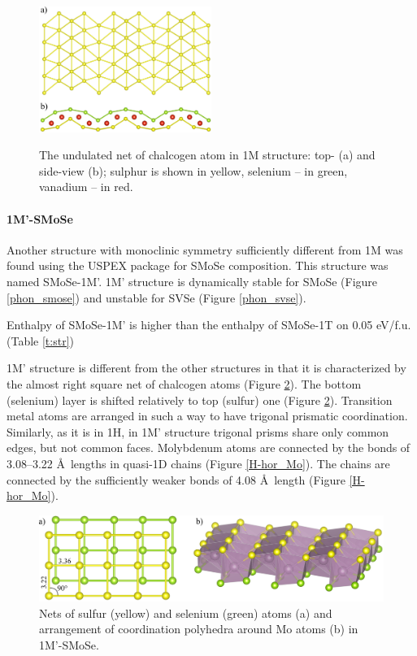 \documentclass[a4paperm]{article}
\begin{document}
\begin{figure}[H]
        \includegraphics[width=0.5\textwidth]{T_hor_hcb.png} \\
        \caption{The undulated net of chalcogen atom in 1M structure: top- (a) and side-view (b); sulphur is shown in yellow, selenium -- in green, vanadium -- in red.}
\label{T_hor_hcb}
\end{figure}



\paragraph{1M'-SMoSe}
Another structure with monoclinic symmetry sufficiently different from 1M was found using the USPEX package for SMoSe composition.
This structure was named SMoSe-1M'.
1M' structure is dynamically stable for SMoSe (Figure \ref{phon_smose}) and unstable for SVSe (Figure \ref{phon_svse}).

Enthalpy of SMoSe-1M' is higher than the enthalpy of SMoSe-1T on 0.05 eV/f.u. (Table \ref{t:str})

1M' structure is different from the other structures in that it is characterized by the almost right square net of chalcogen atoms (Figure \ref{H-hor}).
The bottom (selenium) layer is shifted relatively to top (sulfur) one (Figure \ref{H-hor}).
Transition metal atoms are arranged in such a way to have trigonal prismatic coordination.
Similarly, as it is in 1H, in 1M' structure trigonal prisms share only common edges, but not common faces.
Molybdenum atoms are connected by the bonds of 3.08--3.22 \AA\ lengths in quasi-1D chains (Figure \ref{H-hor_Mo}).
The chains are connected by the sufficiently weaker bonds of 4.08 \AA\ length (Figure \ref{H-hor_Mo}).


\begin{figure}[H]
	\includegraphics[width=\textwidth]{H-hor.png}
	\caption{Nets of sulfur (yellow) and selenium (green) atoms (a) and arrangement of coordination polyhedra around Mo atoms (b) in 1M'-SMoSe.}
	\label{H-hor}
\end{figure} 
\end{document}
